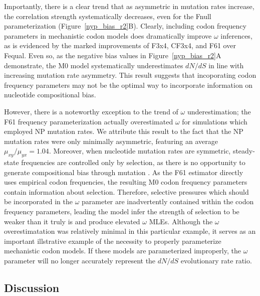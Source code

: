\documentclass[11pt]{article}
\begin{document}
Importantly, there is a clear trend that as asymmetric in mutation rates increase, the correlation strength systematically decreases, even for the Fnull parameterization (Figure~\ref{nyp_bias_r2}B). Clearly, including codon frequency parameters in mechanistic codon models does dramatically improve $\omega$ inferences, as is evidenced by the marked improvements of F3x4, CF3x4, and F61 over Fequal. Even so, as the negative bias values in Figure~\ref{nyp_bias_r2}A demonstrate, the M0 model systematically underestimates $dN/dS$ in line with increasing mutation rate asymmetry. This result suggests that incoporating codon frequency parameters may not be the optimal way to incorporate information on nucleotide compositional bias. 

However, there is a noteworthy exception to the trend of $\omega$ underestimation; the F61 frequency parameterization actually overestimated $\omega$ for simulations which employed NP mutation rates. We attribute this result to the fact that the NP mutation rates were only minimally asymmetric, featuring an average $\mu_{xy}/\mu_{yx} = 1.04$. Moreover, when nucleotide mutation rates are symmetric, steady-state frequencies are controlled only by selection, as there is no opportunity to generate compositional bias through mutation \cite{SellaHirsh2005}. As the F61 estimator directly uses empirical codon frequencies, the resulting M0 codon frequency parameters contain information about selection. Therefore, selective pressures which should be incorporated in the $\omega$ parameter are inadvertently contained within the codon frequency parameters, leading the model infer the strength of selection to be weaker than it truly is and produce elevated $\omega$ MLEs. Although the $\omega$ overestimatation was relatively minimal in this particular example, it serves as an important illstrative example of the necessity to properly parameterize mechanistic codon models. If these models are parameterized improperly, the $\omega$ parameter will no longer accurately represent the $dN/dS$ evolutionary rate ratio.



\subsection*{Discussion}
\end{document}
